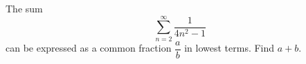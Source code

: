 The sum $$\sum^{\infty}_{n=2} \dfrac{1}{4n^2-1}$$ can be expressed as a common fraction $\dfrac{a}{b}$ in lowest terms. Find $a + b$.
